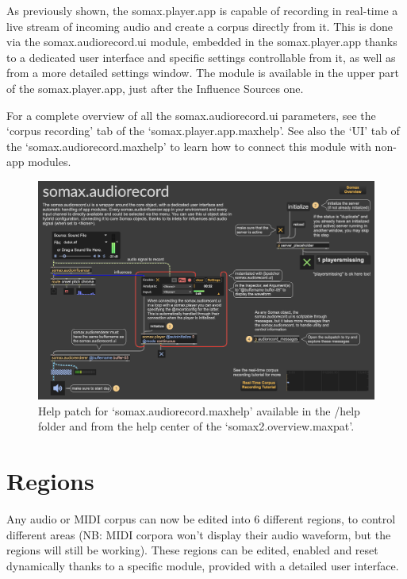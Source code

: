 As previously shown, the somax.player.app is capable of recording in real-time a live stream of incoming audio and create a corpus directly from it.
This is done via the somax.audiorecord.ui module, embedded in the somax.player.app thanks to a dedicated user interface and specific settings controllable from it, as well as from a more detailed settings window. The module is available in the upper part of the somax.player.app, just after the Influence Sources one.

For a complete overview of all the somax.audiorecord.ui parameters, see the `corpus recording' tab of the `somax.player.app.maxhelp'. See also the `UI' tab of the `somax.audiorecord.maxhelp' to learn how to connect this module with non-app modules.

\begin{figure}[H]
    \centering        
 	\includegraphics[width=1\textwidth, keepaspectratio]{img/audiorecord_ui_help.png}
    \caption{Help patch for `somax.audiorecord.maxhelp' available in the /help folder and from the help center of the `somax2.overview.maxpat'.}
    \label{fig:audiorecord_ui_help}
\end{figure}



\section{Regions}

Any audio or MIDI corpus can now be edited into 6 different regions, to control different areas (NB: MIDI corpora won't display their audio waveform, but the regions will still be working). These regions can be edited, enabled and reset dynamically thanks to a specific module, provided with a detailed user interface.

